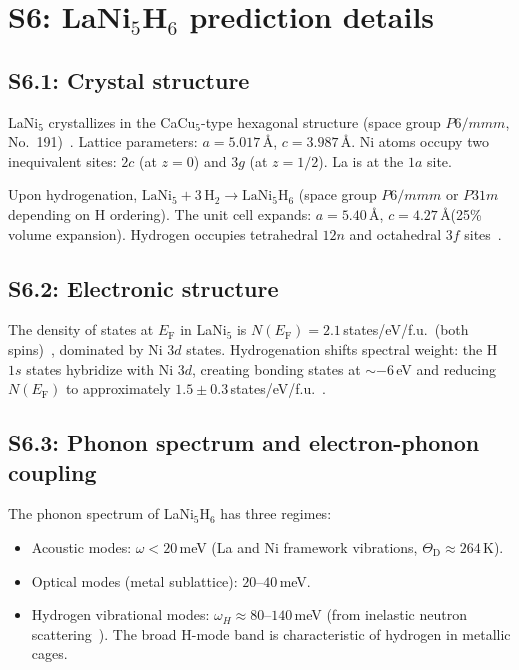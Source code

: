 \documentclass[prb,twocolumn,superscriptaddress,longbibliography,floatfix]{revtex4-2}
\newcommand{\EF}{E_{\mathrm{F}}}
\newcommand{\ThetaD}{\Theta_{\mathrm{D}}}
\begin{document}
\section{S6: LaNi$_5$H$_6$ prediction details}
\label{sec:S6}

\subsection{S6.1: Crystal structure}

LaNi$_5$ crystallizes in the CaCu$_5$-type hexagonal structure
(space group $P6/mmm$, No.~191)~\cite{Percheron1980_S}.
Lattice parameters: $a = 5.017\,$\AA, $c = 3.987\,$\AA.
Ni atoms occupy two inequivalent sites: $2c$ (at $z = 0$)
and $3g$ (at $z = 1/2$).  La is at the $1a$ site.

Upon hydrogenation, $\mathrm{LaNi}_5 + 3\,\mathrm{H}_2
\to \mathrm{LaNi}_5\mathrm{H}_6$ (space group $P6/mmm$ or
$P31m$ depending on H ordering).  The unit cell expands:
$a = 5.40\,$\AA, $c = 4.27\,$\AA (25\% volume expansion).
Hydrogen occupies tetrahedral $12n$ and octahedral $3f$
sites~\cite{Percheron1980_S}.

\subsection{S6.2: Electronic structure}

The density of states at $\EF$ in LaNi$_5$ is
$N(\EF) = 2.1\,$states/eV/f.u.~(both spins)~\cite{Gupta1987_S},
dominated by Ni $3d$ states.  Hydrogenation shifts spectral weight:
the H $1s$ states hybridize with Ni $3d$, creating bonding states
at $\sim -6\,$eV and reducing $N(\EF)$ to approximately
$1.5 \pm 0.3\,$states/eV/f.u.~\cite{Gupta1987_S}.

\subsection{S6.3: Phonon spectrum and electron-phonon coupling}

The phonon spectrum of LaNi$_5$H$_6$ has three regimes:
\begin{itemize}
\item Acoustic modes: $\omega < 20\,$meV
  (La and Ni framework vibrations, $\ThetaD \approx 264\,$K).
\item Optical modes (metal sublattice): $20$--$40\,$meV.
\item Hydrogen vibrational modes: $\omega_H \approx 80$--$140\,$meV
  (from inelastic neutron scattering~\cite{Richter1981_S}).
  The broad H-mode band is characteristic of hydrogen in
  metallic cages.
\end{itemize}
\end{document}
